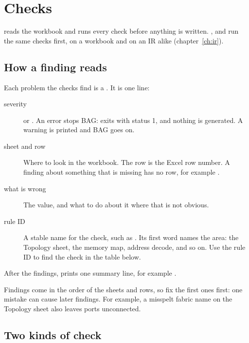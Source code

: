 \chapter{Checks}
\label{ch:checks}

 reads the workbook and runs every check before anything is written.
,  and  run the same checks first, on a
workbook and on an IR alike (chapter~\ref{ch:ir}).

\section{How a finding reads}

Each problem the checks find is a . It is one line:

\begin{center}
\end{center}

\begin{description}
\item[severity]  or . An error stops BAG: 
  exits with status 1, and nothing is generated. A warning is printed and BAG goes on.
\item[sheet and row] Where to look in the workbook. The row is the Excel row number.
  A finding about something that is missing has no row, for example
  .
\item[what is wrong] The value, and what to do about it where that is not obvious.
\item[rule ID] A stable name for the check, such as .
  Its first word names the area:  the Topology sheet,  the memory
  map,  address decode, and so on. Use the rule ID to find the check in the
  table below.
\end{description}

After the findings,  prints one summary line, for example
.

Findings come in the order of the sheets and rows, so fix the first ones first: one
mistake can cause later findings. For example, a misspelt fabric name on the Topology
sheet also leaves ports unconnected.

\section{Two kinds of check}

